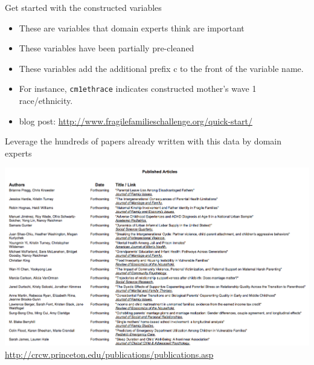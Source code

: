 \documentclass{beamer}
\begin{document}
\begin{frame}

Get started with the constructed variables
\begin{itemize}
\item These are variables that domain experts think are important
\item These variables have been partially pre-cleaned
\item These variables add the additional prefix \alert{c} to the front of the variable name.
\item For instance, \texttt{cm1ethrace} indicates constructed mother's wave 1 race/ethnicity.
\item blog post: \small{\url{http://www.fragilefamilieschallenge.org/quick-start/}}
\end{itemize}

\end{frame}
\begin{frame}

Leverage the hundreds of papers already written with this data by domain experts
\begin{center}
\includegraphics[width=\textwidth]{figures/ffPub1}\\
{\small \url{http://crcw.princeton.edu/publications/publications.asp}}
\end{center}

\end{frame}
\end{document}
